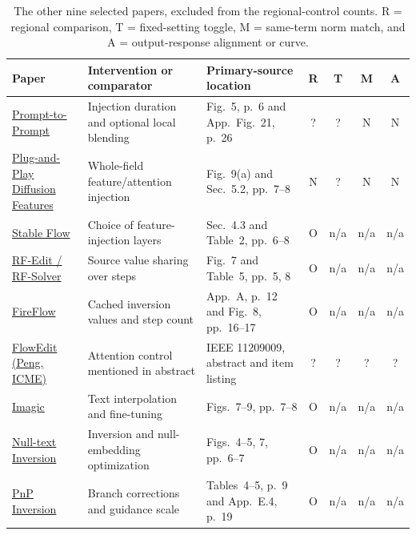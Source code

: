 \begin{table}[t]\centering\small
\caption{The other nine selected papers, excluded from the regional-control counts. R = regional comparison, T = fixed-setting toggle, M = same-term norm match, and A = output-response alignment or curve.}
{\setlength{\tabcolsep}{3pt}\begin{tabularx}{\textwidth}{@{}p{}X p{}cccc@{}}\toprule
Paper & Intervention or comparator & Primary-source location & R & T & M & A\\\midrule
\href{https://openreview.net/pdf?id=_CDixzkzeyb}{Prompt-to-Prompt} & Injection duration and optional local blending & Fig.~5, p.~6 and App.\ Fig.~21, p.~26 & ? & ? & N & N\\
\href{https://openaccess.thecvf.com/content/CVPR2023/papers/Tumanyan_Plug-and-Play_Diffusion_Features_for_Text-Driven_Image-to-Image_Translation_CVPR_2023_paper.pdf}{Plug-and-Play Diffusion Features} & Whole-field feature/attention injection & Fig.~9(a) and Sec.~5.2, pp.~7--8 & N & ? & N & N\\
\href{https://openaccess.thecvf.com/content/CVPR2025/papers/Avrahami_Stable_Flow_Vital_Layers_for_Training-Free_Image_Editing_CVPR_2025_paper.pdf}{Stable Flow} & Choice of feature-injection layers & Sec.~4.3 and Table~2, pp.~6--8 & O & n/a & n/a & n/a\\
\href{https://raw.githubusercontent.com/mlresearch/v267/main/assets/wang25ce/wang25ce.pdf}{RF-Edit / RF-Solver} & Source value sharing over steps & Fig.~7 and Table~5, pp.~5, 8 & O & n/a & n/a & n/a\\
\href{https://raw.githubusercontent.com/mlresearch/v267/main/assets/deng25c/deng25c.pdf}{FireFlow} & Cached inversion values and step count & App.~A, p.~12 and Fig.~8, pp.~16--17 & O & n/a & n/a & n/a\\
\href{https://ieeexplore.ieee.org/document/11209009}{FlowEdit (Peng, ICME)} & Attention control mentioned in abstract & IEEE 11209009, abstract and item listing & ? & ? & ? & ?\\
\href{https://openaccess.thecvf.com/content/CVPR2023/papers/Kawar_Imagic_Text-Based_Real_Image_Editing_With_Diffusion_Models_CVPR_2023_paper.pdf}{Imagic} & Text interpolation and fine-tuning & Figs.~7--9, pp.~7--8 & O & n/a & n/a & n/a\\
\href{https://openaccess.thecvf.com/content/CVPR2023/papers/Mokady_NULL-Text_Inversion_for_Editing_Real_Images_Using_Guided_Diffusion_Models_CVPR_2023_paper.pdf}{Null-text Inversion} & Inversion and null-embedding optimization & Figs.~4--5, 7, pp.~6--7 & O & n/a & n/a & n/a\\
\href{https://proceedings.iclr.cc/paper_files/paper/2024/file/661caac7729aa7d8c6b8ac0d39ccbc6a-Paper-Conference.pdf}{PnP Inversion} & Branch corrections and guidance scale & Tables~4--5, p.~9 and App.~E.4, p.~19 & O & n/a & n/a & n/a\\
\bottomrule\end{tabularx}}
\end{table}
